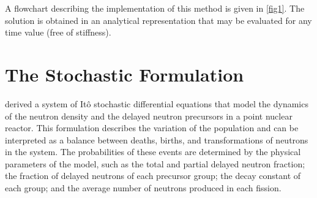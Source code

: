 \documentclass[preprint,12pt,authoryear]{elsarticle}
\begin{document}
A flowchart describing the implementation of this method is given in \cref{fig1}.
The solution is obtained in an analytical representation that may be evaluated for any time value (free of stiffness).

\section{The Stochastic Formulation}
\label{sec3}
\setcounter{section}{3}
\setcounter{equation}{0}

\citet{hayes_05} derived a system of It\^o stochastic differential equations that model the dynamics of the neutron density and the delayed neutron precursors in a point nuclear reactor.
This formulation describes the variation of the population and can be interpreted as a balance between deaths, births, and transformations of neutrons in the system.
The probabilities of these events are determined by the physical parameters of the model, such as the total and partial delayed neutron fraction; the fraction of delayed neutrons of each precursor group; the decay constant of each group; and the average number of neutrons produced in each fission.
\end{document}

